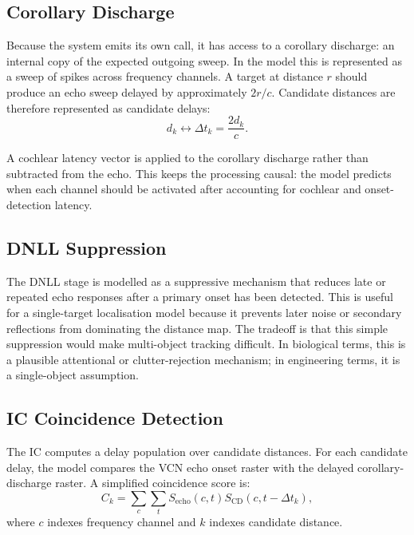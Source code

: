 \subsection{Corollary Discharge}

Because the system emits its own call, it has access to a corollary discharge: an internal copy of the expected outgoing sweep. In the model this is represented as a sweep of spikes across frequency channels. A target at distance $r$ should produce an echo sweep delayed by approximately $2r/c$. Candidate distances are therefore represented as candidate delays:
\begin{equation}
    d_k \leftrightarrow \Delta t_k = \frac{2d_k}{c}.
\end{equation}

A cochlear latency vector is applied to the corollary discharge rather than subtracted from the echo. This keeps the processing causal: the model predicts when each channel should be activated after accounting for cochlear and onset-detection latency.

\subsection{DNLL Suppression}

The DNLL stage is modelled as a suppressive mechanism that reduces late or repeated echo responses after a primary onset has been detected. This is useful for a single-target localisation model because it prevents later noise or secondary reflections from dominating the distance map. The tradeoff is that this simple suppression would make multi-object tracking difficult. In biological terms, this is a plausible attentional or clutter-rejection mechanism; in engineering terms, it is a single-object assumption.

\subsection{IC Coincidence Detection}

The IC computes a delay population over candidate distances. For each candidate delay, the model compares the VCN echo onset raster with the delayed corollary-discharge raster. A simplified coincidence score is:
\begin{equation}
    C_k = \sum_c \sum_t S_{\text{echo}}(c,t)S_{\text{CD}}(c,t-\Delta t_k),
\end{equation}
where $c$ indexes frequency channel and $k$ indexes candidate distance.

